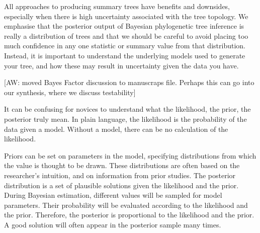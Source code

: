 \documentclass[11pt]{article}
\makeatletter
\newcommand{\aw}[1]{{\textcolor{armygreen}{[AW: #1]}}} %
\newenvironment{boxedtext}[1]{%
  \begin{mdframed}[frametitle=#1,
    frametitlefont=\scshape\mdseries\sffamily,
    frametitlealignment=\centering,
    backgroundcolor=black!20,
    hidealllines=true,
    innerleftmargin=11\p@,innerrightmargin=11\p@,
    frametitleaboveskip=0.5\baselineskip,
    innerbottommargin=0.5\baselineskip,
    skipabove=\baselineskip,skipbelow=0.5\baselineskip]
}{%
  \end{mdframed}%
}
\makeatother
\begin{document}
All approaches to producing summary trees have benefits and downsides, especially when there is high uncertainty associated with the tree topology.
We emphasise that the posterior output of Bayesian phylogenetic tree inference is really a distribution of trees and that we should be careful to avoid placing too much confidence in any one statistic or summary value from that distribution.
Instead, it is important to understand the underlying models used to generate your tree, and how these may result in uncertainty given the data you have.

\aw{moved Bayes Factor discussion to manuscraps file. Perhaps this can go into our synthesis, where we discuss testability}


\clearpage
\begin{boxedtext}{The likelihood, the prior, and the posterior}

It can be confusing for novices to understand what the likelihood, the prior, the posterior truly mean.
In plain language, the likelihood is the probability of the data given a model.
Without a model, there can be no calculation of the likelihood.

Priors can be set on parameters in the model, specifying distributions from which the value is thought to be drawn.
These distributions are often based on the researcher's intuition, and on information from prior studies.
The posterior distribution is a set of plausible solutions given the likelihood and the prior.
During Bayesian estimation, different values will be sampled for model parameters.
Their probability will be evaluated according to the likelihood and the prior.
Therefore, the posterior is proportional to the likelihood and the prior.
A good solution will often appear in the posterior sample many times.

\end{boxedtext}
\end{document}
